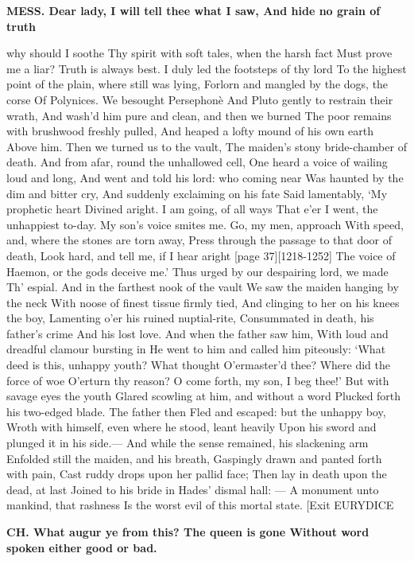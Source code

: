 \documentclass[11pt,letter]{book}
\begin{document}
\par \textbf{MESS. Dear lady, I will tell thee what I saw, And hide no grain of truth}
\par   why should I soothe Thy spirit with soft tales, when the harsh fact Must prove me a liar? Truth is always best. I duly led the footsteps of thy lord To the highest point of the plain, where still was lying, Forlorn and mangled by the dogs, the corse Of Polynices. We besought Persephonè And Pluto gently to restrain their wrath, And wash’d him pure and clean, and then we burned The poor remains with brushwood freshly pulled, And heaped a lofty mound of his own earth Above him. Then we turned us to the vault, The maiden’s stony bride-chamber of death. And from afar, round the unhallowed cell, One heard a voice of wailing loud and long, And went and told his lord:  who coming near Was haunted by the dim and bitter cry, And suddenly exclaiming on his fate Said lamentably, ‘My prophetic heart Divined aright. I am going, of all ways That e’er I went, the unhappiest to-day. My son’s voice smites me. Go, my men, approach With speed, and, where the stones are torn away, Press through the passage to that door of death, Look hard, and tell me, if I hear aright [page 37][1218-1252] The voice of Haemon, or the gods deceive me.’ Thus urged by our despairing lord, we made Th’ espial. And in the farthest nook of the vault We saw the maiden hanging by the neck With noose of finest tissue firmly tied, And clinging to her on his knees the boy, Lamenting o’er his ruined nuptial-rite, Consummated in death, his father’s crime And his lost love. And when the father saw him, With loud and dreadful clamour bursting in He went to him and called him piteously:  ‘What deed is this, unhappy youth? What thought O’ermaster’d thee? Where did the force of woe O’erturn thy reason? O come forth, my son, I beg thee!’ But with savage eyes the youth Glared scowling at him, and without a word Plucked forth his two-edged blade. The father then Fled and escaped:  but the unhappy boy, Wroth with himself, even where he stood, leant heavily Upon his sword and plunged it in his side.— And while the sense remained, his slackening arm Enfolded still the maiden, and his breath, Gaspingly drawn and panted forth with pain, Cast ruddy drops upon her pallid face; Then lay in death upon the dead, at last Joined to his bride in Hades’ dismal hall: — A monument unto mankind, that rashness Is the worst evil of this mortal state. [Exit EURYDICE

\par \textbf{CH. What augur ye from this? The queen is gone Without word spoken either good or bad.}
\par 
\end{document}
